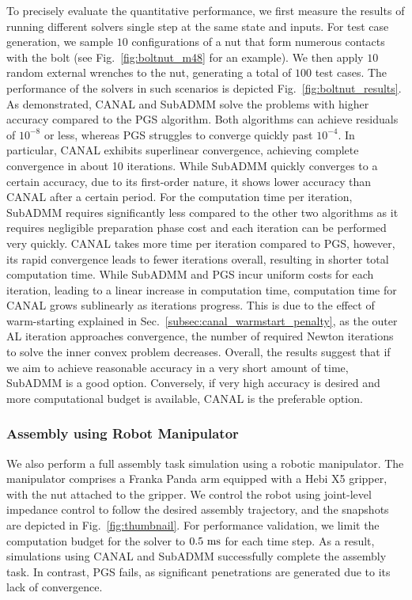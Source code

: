 \documentclass[lettersize,journal]{IEEEtran}
\begin{document}
To precisely evaluate the quantitative performance, we first measure the results of running different solvers single step at the same state and inputs.
For test case generation, we sample $10$ configurations of a nut that form numerous contacts with the bolt (see Fig.~\ref{fig:boltnut_m48} for an example). We then apply $10$ random external wrenches to the nut, generating a total of $100$ test cases.
The performance of the solvers in such scenarios is depicted Fig.~\ref{fig:boltnut_results}. 
As demonstrated, CANAL and SubADMM solve the problems with higher accuracy compared to the PGS algorithm. Both algorithms can achieve residuals of $10^{-8}$ or less, whereas PGS struggles to converge quickly past $10^{-4}$. 
In particular, CANAL exhibits superlinear convergence, achieving complete convergence in about 10 iterations. While SubADMM quickly converges to a certain accuracy, due to its first-order nature, it shows lower accuracy than CANAL after a certain period. 
For the computation time per iteration, SubADMM requires significantly less compared to the other two algorithms as it requires negligible preparation phase cost and each iteration can be performed very quickly. CANAL takes more time per iteration compared to PGS, however, its rapid convergence leads to fewer iterations overall, resulting in shorter total computation time. 
While SubADMM and PGS incur uniform costs for each iteration, leading to a linear increase in computation time, computation time for CANAL grows sublinearly as iterations progress.
This is due to the effect of warm-starting explained in Sec.~\ref{subsec:canal_warmstart_penalty}, as the outer AL iteration approaches convergence, the number of required Newton iterations to solve the inner convex problem decreases.   
Overall, the results suggest that if we aim to achieve reasonable accuracy in a very short amount of time, SubADMM is a good option. Conversely, if very high accuracy is desired and more computational budget is available, CANAL is the preferable option.


\subsubsection{Assembly using Robot Manipulator}

We also perform a full assembly task simulation using a robotic manipulator. The manipulator comprises a Franka Panda arm equipped with a Hebi X5 gripper, with the nut attached to the gripper. We control the robot using joint-level impedance control to follow the desired assembly trajectory, and the snapshots are depicted in Fig.~\ref{fig:thumbnail}. For performance validation, we limit the computation budget for the solver to $0.5~\rm{ms}$ for each time step. As a result, simulations using CANAL and SubADMM successfully complete the assembly task. In contrast, PGS fails, as significant penetrations are generated due to its lack of convergence.
\end{document}
